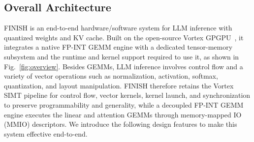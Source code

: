 \documentclass[sigconf,anonymous,nonacm]{acmart}
\newcommand{\ours}{\textsc{FINISH}}
\newcommand{\fpint}{FP-INT}
\begin{document}
\subsection{Overall Architecture}
\ours{} is an end-to-end hardware/software system for LLM inference with quantized weights and KV cache. Built on the open-source Vortex GPGPU~\cite{tine2021vortex}, it integrates a native \fpint{} GEMM engine with a dedicated tensor-memory subsystem and the runtime and kernel support required to use it, as shown in Fig.~\ref{fig:overview}. Besides GEMMs, LLM inference involves control flow and a variety of vector operations such as normalization, activation, softmax, quantization, and layout manipulation. \ours{} therefore retains the Vortex SIMT pipeline for control flow, vector kernels, kernel launch, and synchronization to preserve programmability and generality, while a decoupled \fpint{} GEMM engine executes the linear and attention GEMMs through memory-mapped IO (MMIO) descriptors. We introduce the following design features to make this system effective end-to-end.

\end{document}
